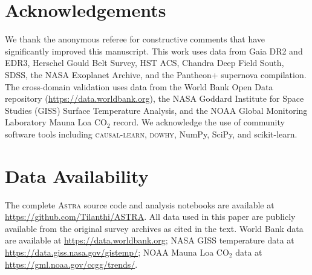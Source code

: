 \documentclass[fleqn,usenatbib]{mnras}
\newcommand{\astra}{\textsc{Astra}\xspace}
\begin{document}
\section*{Acknowledgements}

We thank the anonymous referee for constructive comments that have significantly improved this manuscript.
This work uses data from Gaia DR2 and EDR3, Herschel Gould Belt Survey, HST ACS, Chandra Deep Field South, SDSS, the NASA Exoplanet Archive, and the Pantheon+ supernova compilation.
The cross-domain validation uses data from the World Bank Open Data repository (\url{https://data.worldbank.org}), the NASA Goddard Institute for Space Studies (GISS) Surface Temperature Analysis, and the NOAA Global Monitoring Laboratory Mauna Loa CO$_{2}$ record.
We acknowledge the use of community software tools including \textsc{causal-learn}, \textsc{dowhy}, NumPy, SciPy, and scikit-learn.

\section*{Data Availability}

The complete \astra source code and analysis notebooks are available at \url{https://github.com/Tilanthi/ASTRA}.
All data used in this paper are publicly available from the original survey archives as cited in the text.
World Bank data are available at \url{https://data.worldbank.org}; NASA GISS temperature data at \url{https://data.giss.nasa.gov/gistemp/}; NOAA Mauna Loa CO$_{2}$ data at \url{https://gml.noaa.gov/ccgg/trends/}.



\end{document}
